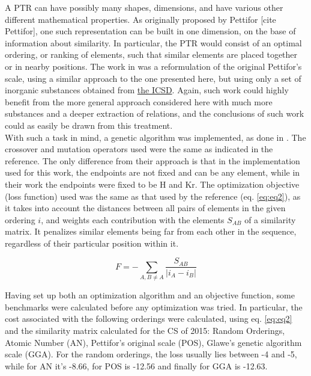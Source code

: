 \documentclass[article]{article}
\begin{document}
A PTR can have possibly many shapes, dimensions, and have various other different mathematical properties. As originally proposed by Pettifor [cite Pettifor], one such representation can be built in one dimension, on the base of information about similarity. In particular, the PTR would consist of an optimal ordering, or ranking of elements, such that similar elements are placed together or in nearby positions. The work in \cite{Glawe_2016} was a reformulation of the original Pettifor's scale, using a similar approach to the one presented here, but using only a set of inorganic substances obtained from \href{https://ucsd.libguides.com/crystallography/icsd}{the ICSD}. Again, such work could highly benefit from the more general approach considered here with much more substances and a deeper extraction of relations, and the conclusions of such work could as easily be drawn from this treatment.\\

With such a task in mind, a genetic algorithm was implemented, as done in \cite{Glawe_2016}. The crossover and mutation operators used were the same as indicated in the reference. The only difference from their approach is that in the implementation used for this work, the endpoints are not fixed and can be any element, while in their work the endpoints were fixed to be H and Kr. The optimization objective (loss function) used was the same as that used by the reference (eq. \ref{eq:eq2}), as it takes into account the distances between all pairs of elements in the given ordering $i$, and weights each contribution with the elements $S_{AB}$ of a similarity matrix. It penalizes similar elements being far from each other in the sequence, regardless of their particular position within it.

\begin{equation}
	\label{eq:eq2}
	F = -\sum_{A,B \neq A} \frac{S_{AB}}{|i_A - i_B|}
\end{equation}

Having set up both an optimization algorithm and an objective function, some benchmarks were calculated before any optimization was tried. In particular, the cost associated with the following orderings were calculated, using eq. \ref{eq:eq2} and the similarity matrix calculated for the CS of 2015: Random Orderings, Atomic Number (AN), Pettifor's original scale (POS), Glawe's genetic algorithm  scale (GGA). For the random orderings, the loss usually lies between -4 and -5, while for AN it's -8.66, for POS is -12.56 and finally for GGA is -12.63. 
\end{document}
